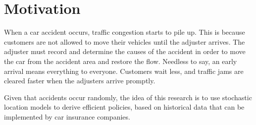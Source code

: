 \section{Motivation}
When a car accident occurs,
traffic congestion starts to pile up.
This is because
customers are not allowed
to move their vehicles until
the adjuster arrives.
The adjuster must record and determine
the causes of the accident
in order to
move the car from the accident area
and restore the flow.
Needless to say,
an early arrival
means everything to everyone.
Customers wait less,
and traffic jams
are cleared faster
when the adjusters arrive promptly.

Given that accidents occur randomly,
the idea of this research
is to use stochastic location models
to derive efficient policies,
based on historical data
that can be implemented
by car insurance companies.
